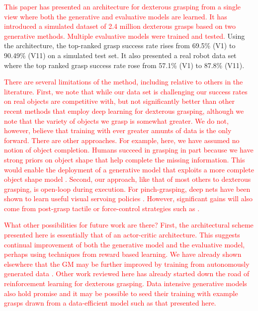 \textcolor{red}{This paper has presented an architecture for dexterous grasping from a single view where both the generative and evaluative models are learned. It has introduced a simulated dataset of 2.4 million dexterous grasps based on two generative methods. Multiple evaluative models were trained and tested.} Using the architecture, the top-ranked grasp success rate  rises from 69.5\% (V1) to 90.49\% (V11) on a simulated test set. It also presented a real robot data set where the top ranked grasp success rate rose from 57.1\% (V1) to 87.8\% (V11).

\textcolor{red}{There are several limitations of the method, including relative to others in the literature. First, we note that while our data set is challenging our success rates on real objects are competitive with, but not significantly better than other recent methods that employ deep learning for dexterous grasping, although we note that the variety of objects we grasp is somewhat greater. We do not, however, believe that training with ever greater amunts of data is the only forward. There are other approaches. For example, here, we have assumed no notion of object completion. Humans succeed in grasping in part because we have strong priors on object shape that help complete the missing information. This would enable the deployment of a generative model that exploits a more complete object shape model \cite{kopicki2015ijrr}. Second, our approach, like that of most others to dexterous grasping, is open-loop during execution. For pinch-grasping, deep nets have been shown to learn useful visual servoing policies \cite{morrison18}. However, significant gains will also come from post-grasp tactile or force-control strategies such as \cite{Torres2018}.}

\textcolor{red}{What other possibilities for future work are there? First, the architectural scheme presented here is essentially that of an actor-critic architecture. This suggests continual improvement of both the generative model and the evaluative model, perhaps using techniques from reward based learning. We have already shown elsewhere that the GM may be further improved by training from autonomously generated data \cite{kopicki2019ijrr}. Other work reviewed here \cite{mandikal2021dexterous,Osa2018} has already started down the road of reinforcement learning for dexterous grasping. Data intensive generative models also hold promise \cite{veres2017modeling,Shao2020,Shang2020,Zhao2020} and it may be possible to seed their training with example grasps drawn from a data-efficient model such as that presented here.}\\